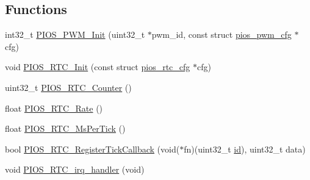 \subsection*{\-Functions}
\begin{DoxyCompactItemize}
\item 
int32\-\_\-t \hyperlink{group___p_i_o_s___p_w_m_ga710b446b9a2b2d27624571eb968ae09f}{\-P\-I\-O\-S\-\_\-\-P\-W\-M\-\_\-\-Init} (uint32\-\_\-t $\ast$pwm\-\_\-id, const struct \hyperlink{structpios__pwm__cfg}{pios\-\_\-pwm\-\_\-cfg} $\ast$cfg)
\item 
void \hyperlink{group___p_i_o_s___p_w_m_ga0edcdea74daf967c3ebbf09d14f21f95}{\-P\-I\-O\-S\-\_\-\-R\-T\-C\-\_\-\-Init} (const struct \hyperlink{structpios__rtc__cfg}{pios\-\_\-rtc\-\_\-cfg} $\ast$cfg)
\item 
uint32\-\_\-t \hyperlink{group___p_i_o_s___p_w_m_ga9d01d1ac8ca6944639f49eeb358a5283}{\-P\-I\-O\-S\-\_\-\-R\-T\-C\-\_\-\-Counter} ()
\item 
float \hyperlink{group___p_i_o_s___p_w_m_ga67f1e1979b94ff871968e14497974af1}{\-P\-I\-O\-S\-\_\-\-R\-T\-C\-\_\-\-Rate} ()
\item 
float \hyperlink{group___p_i_o_s___p_w_m_gad34cae8cd02b5e6de39366292722edba}{\-P\-I\-O\-S\-\_\-\-R\-T\-C\-\_\-\-Ms\-Per\-Tick} ()
\item 
bool \hyperlink{group___p_i_o_s___p_w_m_gaedab634636153fb8507f2fd1667c6f39}{\-P\-I\-O\-S\-\_\-\-R\-T\-C\-\_\-\-Register\-Tick\-Callback} (void($\ast$fn)(uint32\-\_\-t \hyperlink{uavobjectmanager_8c_abaabdc509cdaba7df9f56c6c76f3ae19}{id}), uint32\-\_\-t data)
\item 
void \hyperlink{group___p_i_o_s___p_w_m_ga882b48b1e7ce218715dbcc6268387eb7}{\-P\-I\-O\-S\-\_\-\-R\-T\-C\-\_\-irq\-\_\-handler} (void)
\end{DoxyCompactItemize}
